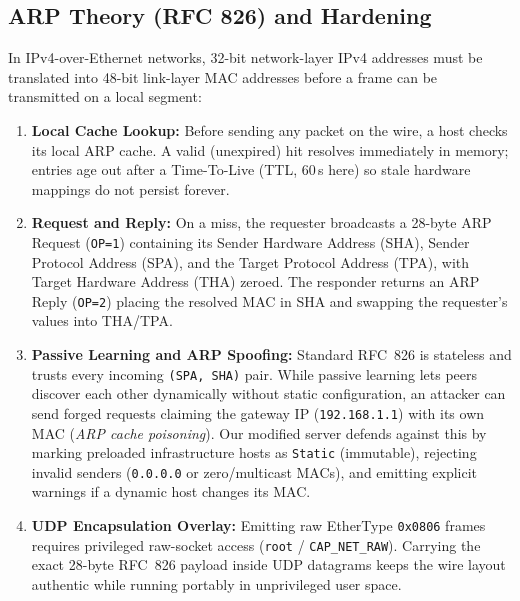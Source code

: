 \documentclass[11pt,a4paper]{article}
\begin{document}
\subsection{ARP Theory (RFC 826) and Hardening}
In IPv4-over-Ethernet networks, 32-bit network-layer IPv4 addresses must be translated into 48-bit link-layer MAC addresses before a frame can be transmitted on a local segment:
\begin{enumerate}
  \item \textbf{Local Cache Lookup:} Before sending any packet on the wire, a host checks its local ARP cache. A valid (unexpired) hit resolves immediately in memory; entries age out after a Time-To-Live (TTL, 60\,s here) so stale hardware mappings do not persist forever.
  \item \textbf{Request and Reply:} On a miss, the requester broadcasts a 28-byte ARP Request (\texttt{OP=1}) containing its Sender Hardware Address (SHA), Sender Protocol Address (SPA), and the Target Protocol Address (TPA), with Target Hardware Address (THA) zeroed. The responder returns an ARP Reply (\texttt{OP=2}) placing the resolved MAC in SHA and swapping the requester's values into THA/TPA.
  \item \textbf{Passive Learning and ARP Spoofing:} Standard RFC~826 is stateless and trusts every incoming \texttt{(SPA, SHA)} pair. While passive learning lets peers discover each other dynamically without static configuration, an attacker can send forged requests claiming the gateway IP (\texttt{192.168.1.1}) with its own MAC (\emph{ARP cache poisoning}). Our modified server defends against this by marking preloaded infrastructure hosts as \texttt{Static} (immutable), rejecting invalid senders (\texttt{0.0.0.0} or zero/multicast MACs), and emitting explicit warnings if a dynamic host changes its MAC.
  \item \textbf{UDP Encapsulation Overlay:} Emitting raw EtherType \texttt{0x0806} frames requires privileged raw-socket access (\texttt{root} / \texttt{CAP\_NET\_RAW}). Carrying the exact 28-byte RFC~826 payload inside UDP datagrams keeps the wire layout authentic while running portably in unprivileged user space.
\end{enumerate}
\end{document}
